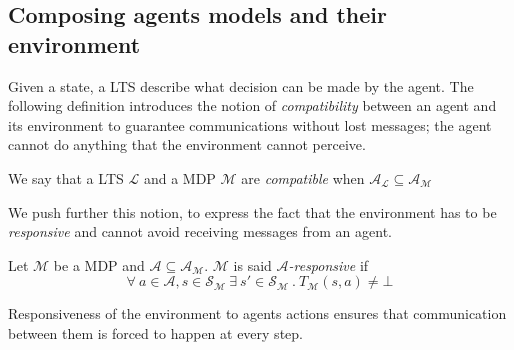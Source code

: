 \subsection{Composing agents models and their environment} %
\label{sub:composing_agents_models_and_their_environment}

Given a state, a \ac{LTS} describe what decision can be made by the agent.
The following definition introduces the notion of \textit{compatibility} between an agent and its environment to guarantee communications without lost messages; the agent cannot do anything that the environment cannot perceive.

\begin{definition}[Compatibility]
We say that a \ac{LTS} $\mathcal{L}$ %
and a \ac{MDP} $\mathcal{M}$ %
are \emph{compatible} when $\mathcal{A}_\mathcal{L} \subseteq \mathcal{A}_\mathcal{M}$
\end{definition}


We push further this notion, to express the fact that the environment has to be \textit{responsive} and cannot avoid receiving messages from an agent.

\begin{definition}
Let $\mathcal{M}$ be a \ac{MDP} and $\mathcal{A} \subseteq \mathcal{A}_\mathcal{M}$. $\mathcal{M}$ is said \emph{$\mathcal{A}$-responsive} if
$$ \forall\ a\in \mathcal{A}, s\in \mathcal{S}_\mathcal{M}\ \exists\ s'\in \mathcal{S}_\mathcal{M}\ .\ T_\mathcal{M}(s,a)\neq \bot $$
\end{definition}

Responsiveness of the environment to agents actions ensures that communication between them is forced to happen at every step. 


